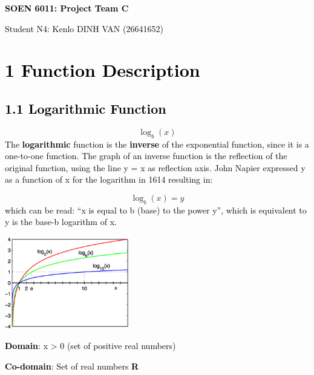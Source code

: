 \documentclass[letterpaper]{article}
\title{}
\author{kenlo dinh-van}
\date{2019-07-13}
\newcommand\textstyleHeadingiiiChar[1]{\textrm{\textcolor[rgb]{0.12156863,0.21568628,0.3882353}{#1}}}
\begin{document}
\clearpage\setcounter{page}{1}\pagestyle{Standard}
{\centering
\textbf{\textcolor{black}{SOEN 6011: Project Team C}}
\par}

{\centering
\textcolor{black}{Student N4: Kenlo DINH VAN (26641652)}
\par}


\bigskip

\section[1 Function Description]{\textbf{\textcolor{black}{1 Function Description}}}
\subsection[1.1 Logarithmic Function]{\textbf{\textcolor{black}{1.1 Logarithmic Function}}}
\begin{equation*}
\log _b(x)
\end{equation*}
\textcolor{black}{The }\textbf{\textcolor{black}{logarithmic}}\textcolor{black}{ function is the
}\textbf{\textcolor{black}{inverse}}\textcolor{black}{ of the exponential function, since it is a one-to-one function.
The graph of an inverse function is the reflection of the original function, using the line y = x as reflection axis.
John Napier expressed y as a function of x for the logarithm in 1614 resulting in:}

\begin{equation*}
\log _b(x)=y
\end{equation*}
\textcolor{black}{which can be read: ``x is equal to b (base) to the power y'', which is equivalent to {\textquotedbl}y
is the base-b logarithm of x.{\textquotedbl}}

{\centering  \includegraphics[width=5.44cm,height=4.038cm]{N4PB12-img001.png} \par}
\textstyleHeadingiiiChar{\textbf{\textcolor{black}{Domain}}\textcolor{black}{:}}\textcolor{black}{ x {\textgreater} 0
(set of positive real numbers) }

\textstyleHeadingiiiChar{\textbf{\textcolor{black}{Co-domain}}}\textcolor{black}{: Set of real numbers
}\textbf{\textcolor{black}{R}}
\end{document}
